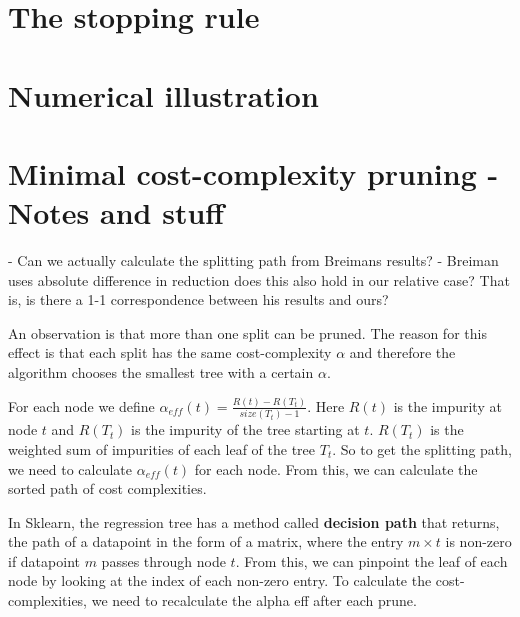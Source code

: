 \documentclass[11pt,a4paper]{article}
\begin{document}
%

\section{The stopping rule}

\section{Numerical illustration}

\section{Minimal cost-complexity pruning - Notes and stuff}


- Can we actually calculate the splitting path from Breimans results?
- Breiman uses absolute difference in reduction does this also hold in our
relative case? That is, is there a 1-1 correspondence between his results and
ours?

An observation is that more than one split can be pruned. The reason for this
effect is that each split has the same cost-complexity $ \alpha $ and therefore
the algorithm chooses the smallest tree with a certain $ \alpha $.

For each node we define $\alpha_{eff}(t) = \frac{R(t) - R(T_t)}{size(T_t) - 1}$.
Here $ R(t) $ is the impurity at node $ t $ and $ R(T_t) $ is the impurity of the
tree starting at $ t $. $ R(T_t) $ is the weighted sum of impurities of each
leaf of the tree $ T_t$. So to get the splitting path, we need to calculate
$\alpha_{eff}(t)$ for each node. From this, we can calculate the sorted path of
cost complexities.

In Sklearn, the regression tree has a method called \textbf{decision path} that
returns, the path of a datapoint in the form of a matrix, where the entry $ m \times
	t $ is non-zero if datapoint $ m $ passes through node $ t $. From this, we can
pinpoint the leaf of each node by looking at the index of each non-zero entry.
To calculate the cost-complexities, we need to recalculate the alpha eff after
each prune.
\end{document}
